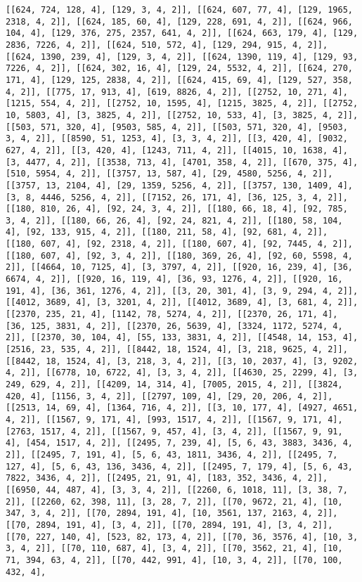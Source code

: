 \documentclass[12pt,fleqn]{article}\usepackage{../../common}
\begin{document}
\begin{verbatim}
[[624, 724, 128, 4], [129, 3, 4, 2]], [[624, 607, 77, 4], [129, 1965, 2318, 4, 2]], [[624, 185, 60, 4], [129, 228, 691, 4, 2]], [[624, 966, 104, 4], [129, 376, 275, 2357, 641, 4, 2]], [[624, 663, 179, 4], [129, 2836, 7226, 4, 2]], [[624, 510, 572, 4], [129, 294, 915, 4, 2]], [[624, 1390, 239, 4], [129, 3, 4, 2]], [[624, 1390, 119, 4], [129, 93, 7226, 4, 2]], [[624, 302, 16, 4], [129, 24, 5532, 4, 2]], [[624, 270, 171, 4], [129, 125, 2838, 4, 2]], [[624, 415, 69, 4], [129, 527, 358, 4, 2]], [[775, 17, 913, 4], [619, 8826, 4, 2]], [[2752, 10, 271, 4], [1215, 554, 4, 2]], [[2752, 10, 1595, 4], [1215, 3825, 4, 2]], [[2752, 10, 5803, 4], [3, 3825, 4, 2]], [[2752, 10, 533, 4], [3, 3825, 4, 2]], [[503, 571, 320, 4], [9503, 585, 4, 2]], [[503, 571, 320, 4], [9503, 3, 4, 2]], [[8590, 51, 1253, 4], [3, 3, 4, 2]], [[3, 420, 4], [9032, 627, 4, 2]], [[3, 420, 4], [1243, 711, 4, 2]], [[4015, 10, 1638, 4], [3, 4477, 4, 2]], [[3538, 713, 4], [4701, 358, 4, 2]], [[670, 375, 4], [510, 5954, 4, 2]], [[3757, 13, 587, 4], [29, 4580, 5256, 4, 2]], [[3757, 13, 2104, 4], [29, 1359, 5256, 4, 2]], [[3757, 130, 1409, 4], [3, 8, 4446, 5256, 4, 2]], [[7152, 26, 171, 4], [36, 125, 3, 4, 2]], [[180, 810, 26, 4], [92, 24, 3, 4, 2]], [[180, 66, 18, 4], [92, 785, 3, 4, 2]], [[180, 66, 26, 4], [92, 24, 821, 4, 2]], [[180, 58, 104, 4], [92, 133, 915, 4, 2]], [[180, 211, 58, 4], [92, 681, 4, 2]], [[180, 607, 4], [92, 2318, 4, 2]], [[180, 607, 4], [92, 7445, 4, 2]], [[180, 607, 4], [92, 3, 4, 2]], [[180, 369, 26, 4], [92, 60, 5598, 4, 2]], [[4664, 10, 7125, 4], [3, 3797, 4, 2]], [[920, 16, 239, 4], [36, 6674, 4, 2]], [[920, 16, 119, 4], [36, 93, 1276, 4, 2]], [[920, 16, 191, 4], [36, 361, 1276, 4, 2]], [[3, 20, 301, 4], [3, 9, 294, 4, 2]], [[4012, 3689, 4], [3, 3201, 4, 2]], [[4012, 3689, 4], [3, 681, 4, 2]], [[2370, 235, 21, 4], [1142, 78, 5274, 4, 2]], [[2370, 26, 171, 4], [36, 125, 3831, 4, 2]], [[2370, 26, 5639, 4], [3324, 1172, 5274, 4, 2]], [[2370, 30, 104, 4], [55, 133, 3831, 4, 2]], [[4548, 14, 153, 4], [2516, 23, 535, 4, 2]], [[8442, 18, 1524, 4], [3, 218, 9625, 4, 2]], [[8442, 18, 1524, 4], [3, 218, 3, 4, 2]], [[3, 10, 2037, 4], [3, 9202, 4, 2]], [[6778, 10, 6722, 4], [3, 3, 4, 2]], [[4630, 25, 2299, 4], [3, 249, 629, 4, 2]], [[4209, 14, 314, 4], [7005, 2015, 4, 2]], [[3824, 420, 4], [1156, 3, 4, 2]], [[2797, 109, 4], [29, 20, 206, 4, 2]], [[2513, 14, 69, 4], [1364, 716, 4, 2]], [[3, 10, 177, 4], [4927, 4651, 4, 2]], [[1567, 9, 171, 4], [993, 1517, 4, 2]], [[1567, 9, 171, 4], [2763, 1517, 4, 2]], [[1567, 9, 457, 4], [3, 4, 2]], [[1567, 9, 91, 4], [454, 1517, 4, 2]], [[2495, 7, 239, 4], [5, 6, 43, 3883, 3436, 4, 2]], [[2495, 7, 191, 4], [5, 6, 43, 1811, 3436, 4, 2]], [[2495, 7, 127, 4], [5, 6, 43, 136, 3436, 4, 2]], [[2495, 7, 179, 4], [5, 6, 43, 7822, 3436, 4, 2]], [[2495, 21, 91, 4], [183, 352, 3436, 4, 2]], [[6950, 44, 487, 4], [3, 3, 4, 2]], [[2260, 6, 1018, 11], [3, 38, 7, 2]], [[2260, 62, 398, 11], [3, 28, 7, 2]], [[70, 9672, 21, 4], [10, 347, 3, 4, 2]], [[70, 2894, 191, 4], [10, 3561, 137, 2163, 4, 2]], [[70, 2894, 191, 4], [3, 4, 2]], [[70, 2894, 191, 4], [3, 4, 2]], [[70, 227, 140, 4], [523, 82, 173, 4, 2]], [[70, 36, 3576, 4], [10, 3, 3, 4, 2]], [[70, 110, 687, 4], [3, 4, 2]], [[70, 3562, 21, 4], [10, 71, 394, 63, 4, 2]], [[70, 442, 991, 4], [10, 3, 4, 2]], [[70, 100, 432, 4], 
\end{verbatim}
\end{document}
